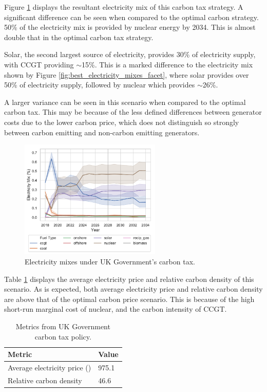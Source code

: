 Figure \ref{fig:uk_government_carbon_tax_strategy_scenario} displays the resultant electricity mix of this carbon tax strategy. A significant difference can be seen when compared to the optimal carbon strategy. 50\% of the electricity mix is provided by nuclear energy by 2034. This is almost double that in the optimal carbon tax strategy. 

Solar, the second largest source of electricity, provides 30\% of electricity supply, with CCGT providing ${\sim}$15\%. This is a marked difference to the electricity mix shown by Figure \ref{fig:best_electricity_mixes_facet}, where solar provides over 50\% of electricity supply, followed by nuclear which provides ${\sim}$26\%. 

A larger variance can be seen in this scenario when compared to the optimal carbon tax. This may be because of the less defined differences between generator costs due to the lower carbon price, which does not distinguish so strongly between carbon emitting and non-carbon emitting generators. 

\begin{figure}
	\centering
	\includegraphics[width=0.6\textwidth]{Chapter6/figures/results/uk_scenario_co2_strategy.pdf}
	\caption{Electricity mixes under UK Government's carbon tax.}
	\label{fig:uk_government_carbon_tax_strategy_scenario}
\end{figure}

Table \ref{carbonoptim:table:mix} displays the average electricity price and relative carbon density of this scenario. As is expected, both average electricity price and relative carbon density are above that of the optimal carbon price scenario. This is because of the high short-run marginal cost of nuclear, and the carbon intensity of CCGT. 

\begin{table}[]
	\centering
	\label{carbonoptim:table:mix}	
	\begin{tabular}{@{}ll@{}}
		\toprule
		Metric & Value \\ \midrule
		Average electricity price (\textsterling) & 975.1 \\
		Relative carbon density                   & 46.6  \\ \bottomrule
	\end{tabular}
	\caption{Metrics from UK Government carbon tax policy.}
\end{table}

